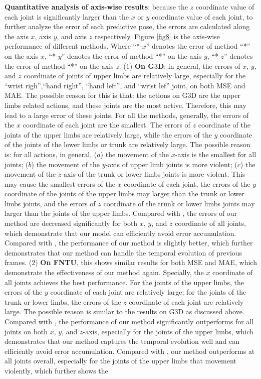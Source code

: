 \documentclass[journal]{IEEEtran}
\begin{document}
{\bf Quantitative analysis of axis-wise results}: because the ${z}$ coordinate value of each joint is significantly larger than the ${x}$ or ${y}$ coordinate value of each joint, to further analyze the error of each predictive pose, the errors are calculated along the axis ${x}$, axis ${y}$, and axis ${z}$ respectively. Figure \ref{fig8} is the axis-wise performance of different methods. Where ``*-${x}$'' denotes the error of method ``*'' on the axis ${x}$, ``*-${y}$'' denotes the error of method ``*'' on the axis ${y}$, ``*-${z}$'' denotes the error of method ``*'' on the axis ${z}$. (${1}$) {\bf On G${3}$D}: in general, the errors of ${x}$, ${y}$, and ${z}$ coordinate of joints of upper limbs are relatively large, especially for the ``wrist righ'',``hand right'', ``hand left'', and ``wrist lef'' joint, on both MSE and MAE. The possible reason for this is that: the actions on G${3}$D are the upper limbs related actions, and these joints are the most active. Therefore, this may lead to a large error of these joints. For all the methods, generally, the errors of the ${x}$ coordinate of each joint are the smallest. The errors of ${z}$ coordinate of the joints of the upper limbs are relatively large, while the errors of the ${y}$ coordinate of the joints of the lower limbs or trunk are relatively large. The possible reason is: for all actions, in general, (${a}$) the movement of the ${x}$-axis is the smallest for all joints; (${b}$) the movement of the ${y}$-axis of upper limb joints is more violent; (${c}$) the movement of the ${z}$-axis of the trunk or lower limbs joints is more violent. This may cause the smallest errors of the ${x}$ coordinate of each joint, the errors of the ${y}$ coordinate of the joints of the upper limbs may larger than the trunk or lower limbs joints, and the errors of ${z}$ coordinate of the trunk or lower limbs joints may larger than the joints of the upper limbs. Compared with \cite{predcnn}, the errors of our method are decreased significantly for both ${x}$, ${y}$, and ${z}$ coordinate of all joints, which demonstrate that our model can efficiently avoid error accumulation. Compared with \cite{ButepageDRL}, the performance of our method is slightly better, which further demonstrates that our method can handle the temporal evolution of previous frames. (${2}$) {\bf On FNTU}, this shows similar results for both MSE and MAE, which demonstrate the effectiveness of our method again. Specially, the ${x}$ coordinate of all joints achieves the best performance. For the joints of the upper limbs, the errors of the ${y}$ coordinate of each joint are relatively large; for the joints of the trunk or lower limbs, the errors of the ${z}$ coordinate of each joint are relatively large. The possible reason is similar to the results on G${3}$D as discussed above. Compared with \cite{predcnn}, the performance of our method significantly outperforms \cite{predcnn} for all joints on both ${x}$, ${y}$, and ${z}$-axis, especially for the joints of the upper limbs, which demonstrates that our method captures the temporal evolution well and can efficiently avoid error accumulation. Compared with \cite{ButepageDRL}, our method outperforms \cite{ButepageDRL} at all joints overall, especially for the joints of the upper limbs that movement violently, which further shows the 
\end{document}
